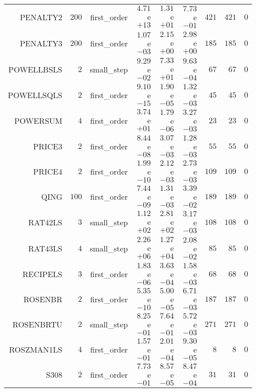 \begin{longtable}{rrrrrrrrr}
PENALTY2 & \(   200\) & first\_order & \( 4.71\)e\(+13\) & \( 1.31\)e\(+01\) & \( 7.73\)e\(-01\) & \(   421\) & \(   421\) & \(     0\) \\
PENALTY3 & \(   200\) & first\_order & \( 1.07\)e\(-03\) & \( 2.15\)e\(+00\) & \( 2.98\)e\(+00\) & \(   185\) & \(   185\) & \(     0\) \\
POWELLBSLS & \(     2\) & small\_step & \( 9.29\)e\(-02\) & \( 7.33\)e\(+01\) & \( 9.63\)e\(-04\) & \(    67\) & \(    67\) & \(     0\) \\
POWELLSQLS & \(     2\) & first\_order & \( 9.10\)e\(-15\) & \( 1.90\)e\(-05\) & \( 1.32\)e\(-03\) & \(    45\) & \(    45\) & \(     0\) \\
POWERSUM & \(     4\) & first\_order & \( 3.74\)e\(+01\) & \( 1.79\)e\(-06\) & \( 3.27\)e\(-03\) & \(    23\) & \(    23\) & \(     0\) \\
PRICE3 & \(     2\) & first\_order & \( 8.44\)e\(-08\) & \( 3.07\)e\(-03\) & \( 1.28\)e\(-03\) & \(    55\) & \(    55\) & \(     0\) \\
PRICE4 & \(     2\) & first\_order & \( 1.99\)e\(-10\) & \( 2.12\)e\(-03\) & \( 2.73\)e\(-03\) & \(   109\) & \(   109\) & \(     0\) \\
QING & \(   100\) & first\_order & \( 7.44\)e\(-09\) & \( 1.31\)e\(-03\) & \( 3.39\)e\(-02\) & \(   189\) & \(   189\) & \(     0\) \\
RAT42LS & \(     3\) & small\_step & \( 1.12\)e\(+02\) & \( 2.81\)e\(+02\) & \( 3.17\)e\(-03\) & \(   108\) & \(   108\) & \(     0\) \\
RAT43LS & \(     4\) & small\_step & \( 2.26\)e\(+06\) & \( 1.27\)e\(+04\) & \( 2.08\)e\(-02\) & \(    85\) & \(    85\) & \(     0\) \\
RECIPELS & \(     3\) & first\_order & \( 1.83\)e\(-06\) & \( 3.63\)e\(-04\) & \( 1.58\)e\(-03\) & \(    68\) & \(    68\) & \(     0\) \\
ROSENBR & \(     2\) & first\_order & \( 5.35\)e\(-10\) & \( 5.00\)e\(-05\) & \( 6.71\)e\(-03\) & \(   187\) & \(   187\) & \(     0\) \\
ROSENBRTU & \(     2\) & small\_step & \( 8.25\)e\(-01\) & \( 7.64\)e\(-01\) & \( 5.72\)e\(-03\) & \(   271\) & \(   271\) & \(     0\) \\
ROSZMAN1LS & \(     4\) & first\_order & \( 1.57\)e\(-01\) & \( 2.01\)e\(-04\) & \( 9.30\)e\(-05\) & \(     8\) & \(     8\) & \(     0\) \\
S308 & \(     2\) & first\_order & \( 7.73\)e\(-01\) & \( 8.57\)e\(-05\) & \( 8.47\)e\(-04\) & \(    31\) & \(    31\) & \(     0\) \\

\end{longtable}
